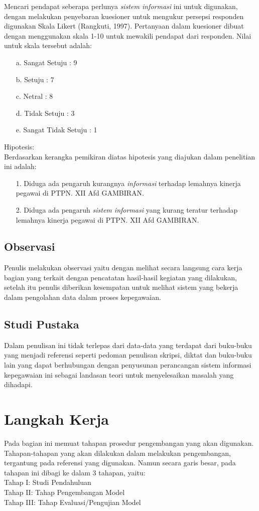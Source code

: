 \documentclass{jtetiproposalskripsi}
\begin{document}
Mencari pendapat seberapa perlunya \emph{sistem informasi} ini untuk digunakan, dengan melakukan penyebaran kuesioner untuk mengukur persepsi responden digunakan Skala Likert (Rangkuti, 1997). Pertanyaan dalam kuesioner dibuat dengan menggunakan skala 1-10 untuk mewakili pendapat dari responden. Nilai untuk skala tersebut adalah:
\begin{itemize}
\item[a.] Sangat Setuju 		: 9
\item[b.] Setuju 				: 7
\item[c.] Netral				: 8
\item[d.] Tidak Setuju			: 3
\item[e.] Sangat Tidak Setuju	: 1
\end{itemize}
Hipotesis:\\
Berdasarkan  kerangka pemikiran diatas hipotesis yang diajukan dalam penelitian ini adalah:
\begin{itemize}
\item[1.] Diduga ada pengaruh kurangnya \emph{informasi} terhadap lemahnya kinerja pegawai di PTPN. XII Afd GAMBIRAN.
\item[2.] Diduga ada pengaruh \emph{sistem informasi} yang kurang teratur terhadap lemahnya kinerja pegawai di PTPN. XII Afd GAMBIRAN.
\end{itemize}
\subsection{Observasi}
Penulis melakukan observasi yaitu dengan melihat secara langsung cara kerja bagian yang terkait dengan pencatatan hasil-hasil kegiatan yang dilakukan, setelah itu penulis diberikan kesempatan untuk melihat sistem yang bekerja dalam pengolahan data dalam proses kepegawaian.
\subsection{Studi Pustaka}
Dalam penulisan ini tidak terlepas dari data-data yang terdapat dari buku-buku yang menjadi referensi seperti pedoman penulisan skripsi, diktat dan buku-buku lain yang dapat berhubungan dengan penyusunan perancangan sistem informasi kepegawaian ini sebagai landasan teori untuk menyelesaikan masalah yang dihadapi.

\section{Langkah Kerja}
Pada bagian ini memuat tahapan prosedur pengembangan yang akan digunakan. Tahapan-tahapan yang akan dilakukan dalam melakukan pengembangan, tergantung pada referensi yang digunakan. Namun secara garis besar, pada tahapan ini dibagi ke dalam 3 tahapan, yaitu:  
\\ Tahap I: Studi Pendahuluan
\\ Tahap II: Tahap Pengembangan Model
\\ Tahap III: Tahap Evaluasi/Pengujian Model
\end{document}
